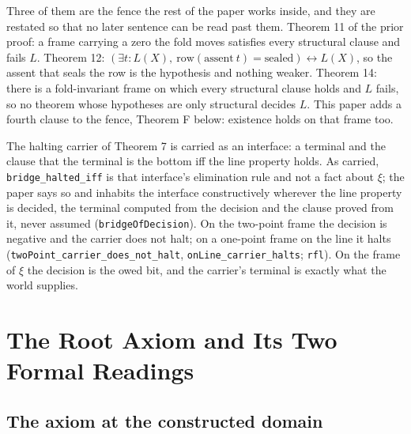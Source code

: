 \documentclass[10pt]{article}
\begin{document}
Three of them are the fence the rest of the paper works inside, and they
are restated so that no later sentence can be read past them. Theorem 11
of the prior proof: a frame carrying a zero the fold moves satisfies
every structural clause and fails \(L\). Theorem 12:
\((\exists t : L(X),\ \mathrm{row}(\mathrm{assent}\ t) = \mathrm{sealed}) \leftrightarrow L(X)\),
so the assent that seals the row is the hypothesis and nothing weaker.
Theorem 14: there is a fold-invariant frame on which every structural
clause holds and \(L\) fails, so no theorem whose hypotheses are only
structural decides \(L\). This paper adds a fourth clause to the fence,
Theorem F below: existence holds on that frame too.

The halting carrier of Theorem 7 is carried as an interface: a terminal
and the clause that the terminal is the bottom iff the line property
holds. As carried, \texttt{bridge\_\allowbreak halted\_\allowbreak iff}
is that interface's elimination rule and not a fact about \(\xi\); the
paper says so and inhabits the interface constructively wherever the
line property is decided, the terminal computed from the decision and
the clause proved from it, never assumed (\texttt{bridgeOfDecision}). On
the two-point frame the decision is negative and the carrier does not
halt; on a one-point frame on the line it halts
(\texttt{twoPoint\_\allowbreak carrier\_\allowbreak does\_\allowbreak not\_\allowbreak halt},
\texttt{onLine\_\allowbreak carrier\_\allowbreak halts}; \texttt{rfl}).
On the frame of \(\xi\) the decision is the owed bit, and the carrier's
terminal is exactly what the world supplies.

\hypertarget{the-root-axiom-and-its-two-formal-readings}{%
\section{The Root Axiom and Its Two Formal
Readings}\label{the-root-axiom-and-its-two-formal-readings}}

\hypertarget{the-axiom-at-the-constructed-domain}{%
\subsection{The axiom at the constructed
domain}\label{the-axiom-at-the-constructed-domain}}
\end{document}
